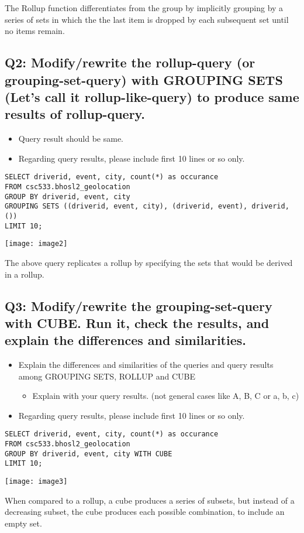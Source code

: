 \documentclass[]{article}
\begin{document}
The Rollup function differentiates from the group by implicitly grouping by a series of sets in which the the last item is dropped by each subsequent set until no items remain.

\subsection*{Q2: Modify/rewrite the rollup-query (or grouping-set-query) with GROUPING SETS (Let’s call it rollup-like-query) to produce same results of rollup-query.}

\begin{itemize}[before=\itshape,font=\normalfont]
	\item Query result should be same.
	\item Regarding query results, please include first 10 lines or so only.
\end{itemize}

\begin{verbatim}
SELECT driverid, event, city, count(*) as occurance
FROM csc533.bhosl2_geolocation
GROUP BY driverid, event, city
GROUPING SETS ((driverid, event, city), (driverid, event), driverid, ())
LIMIT 10;
\end{verbatim}

\texttt{[image: image2]}

The above query replicates a rollup by specifying the sets that would be derived in a rollup.

\subsection*{Q3: Modify/rewrite the grouping-set-query with CUBE. Run it, check the results, and explain the differences and similarities.}

\begin{itemize}[before=\itshape,font=\normalfont]
	\item Explain the differences and similarities of the queries and query results among GROUPING SETS, ROLLUP and CUBE
	\begin{itemize}
		\item Explain with your query results. (not general cases like A, B, C or a, b, c)
	\end{itemize}
	\item Regarding query results, please include first 10 lines or so only.
\end{itemize}

\begin{verbatim}
SELECT driverid, event, city, count(*) as occurance
FROM csc533.bhosl2_geolocation
GROUP BY driverid, event, city WITH CUBE
LIMIT 10;
\end{verbatim}

\texttt{[image: image3]}

When compared to a rollup, a cube produces a series of subsets, but instead of a decreasing subset, the cube produces each possible combination, to include an empty set.
\end{document}
